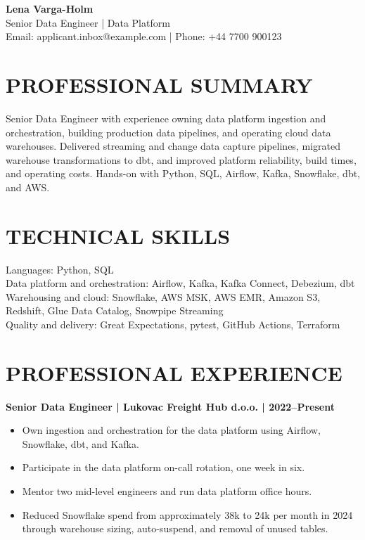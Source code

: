 \documentclass[11pt,a4paper]{article}
\begin{document}
\begin{center}
{\LARGE\bfseries\color{primarycolor} Lena Varga-Holm}\\[0.2em]
{\large\color{accentcolor} Senior Data Engineer | Data Platform}\\[0.25em]
Email: applicant.inbox@example.com | Phone: +44 7700 900123
\end{center}

\section*{PROFESSIONAL SUMMARY}
Senior Data Engineer with experience owning data platform ingestion and orchestration, building production data pipelines, and operating cloud data warehouses. Delivered streaming and change data capture pipelines, migrated warehouse transformations to dbt, and improved platform reliability, build times, and operating costs. Hands-on with Python, SQL, Airflow, Kafka, Snowflake, dbt, and AWS.

\section*{TECHNICAL SKILLS}
Languages: Python, SQL\\
Data platform and orchestration: Airflow, Kafka, Kafka Connect, Debezium, dbt\\
Warehousing and cloud: Snowflake, AWS MSK, AWS EMR, Amazon S3, Redshift, Glue Data Catalog, Snowpipe Streaming\\
Quality and delivery: Great Expectations, pytest, GitHub Actions, Terraform

\section*{PROFESSIONAL EXPERIENCE}
\textbf{Senior Data Engineer | Lukovac Freight Hub d.o.o. | 2022–Present}
\begin{itemize}
\item Own ingestion and orchestration for the data platform using Airflow, Snowflake, dbt, and Kafka.
\item Participate in the data platform on-call rotation, one week in six.
\item Mentor two mid-level engineers and run data platform office hours.
\item Reduced Snowflake spend from approximately 38k to 24k per month in 2024 through warehouse sizing, auto-suspend, and removal of unused tables.
\end{itemize}
\end{document}
